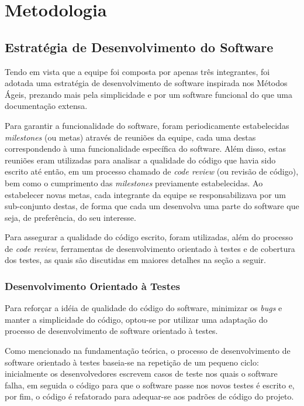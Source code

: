 
\chapter{Metodologia}

\section{Estratégia de Desenvolvimento do Software}

Tendo em vista que a equipe foi composta por apenas três integrantes, foi adotada uma estratégia de desenvolvimento de software inspirada nos Métodos Ágeis, prezando mais pela simplicidade e por um software funcional do que uma documentação extensa.

Para garantir a funcionalidade do software, foram periodicamente estabelecidas \emph{milestones} (ou metas) através de reuniões da equipe, cada uma destas correspondendo à uma funcionalidade específica do software.
Além disso, estas reuniões eram utilizadas para analisar a qualidade do código que havia sido escrito até então, em um processo chamado de \emph{code review} (ou revisão de código), bem como o cumprimento das \emph{milestones} previamente estabelecidas.
Ao estabelecer novas metas, cada integrante da equipe se responsabilizava por um sub-conjunto destas, de forma que cada um desenvolva uma parte do software que seja, de preferência, do seu interesse.

Para assegurar a qualidade do código escrito, foram utilizadas, além do processo de \emph{code review}, ferramentas de desenvolvimento orientado à testes e de cobertura dos testes, as quais são discutidas em maiores detalhes na seção a seguir.

\subsection{Desenvolvimento Orientado à Testes}

Para reforçar a idéia de qualidade do código do software, minimizar os \emph{bugs} e manter a simplicidade do código, optou-se por utilizar uma adaptação do processo de desenvolvimento de software orientado à testes.

Como mencionado na fundamentação teórica, o processo de desenvolvimento de software orientado à testes baseia-se na repetição de um pequeno ciclo: inicialmente os desenvolvedores escrevem casos de teste nos quais o software falha, em seguida o código para que o software passe nos novos testes é escrito e, por fim, o código é refatorado para adequar-se aos padrões de código do projeto.

